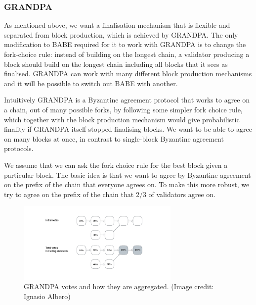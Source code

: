 


\subsubsection{GRANDPA} \label{sec:grandpa}


As mentioned above, we want a finalisation mechanism that is flexible and separated from block production, which is achieved by GRANDPA. The only modification to BABE required for it to work with GRANDPA is to change the fork-choice rule: instead of building on the longest chain, a validator producing a block should build on the longest chain including all blocks that it sees as finalised. GRANDPA can work with many different block production mechanisms and it will be possible to switch out BABE with another.

Intuitively GRANDPA is a Byzantine agreement protocol that works to agree on a chain, out of many possible forks, by following some simpler fork choice rule, which together with the block production mechanism would give probabilistic finality if GRANDPA itself stopped finalising blocks. We want to be able to agree on many blocks at once, in contrast to single-block Byzantine agreement protocols.

We assume that we can ask the fork choice rule for the best block given a particular block. The basic idea is that we want to agree by Byzantine agreement on the prefix of the chain that everyone agrees on. To make this more robust, we try to agree on the prefix of the chain that 2/3 of validators agree on.

\begin{figure}[h!]
  \centering
  \includegraphics[width=0.7\textwidth]{images/Grandpa.png}
  \caption{GRANDPA votes and how they are aggregated. (Image credit: Ignasio Albero)}
    \label{fig:grandpa}
\end{figure}

